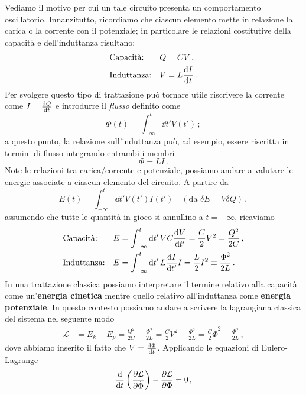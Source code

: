 \noindent Vediamo il motivo per cui un tale circuito presenta un comportamento oscillatorio. Innanzitutto, ricordiamo che ciascun elemento mette in relazione la carica o la corrente con il potenziale; in particolare le relazioni costitutive della capacità e dell'induttanza risultano:
\begin{align*}
    &\text{Capacità:} &Q & =CV\, , \\
    &\text{Induttanza:} &V &= L\dv{I}{t}\, .
\end{align*}
Per svolgere questo tipo di trattazione può tornare utile riscrivere la corrente come $I=\dv{Q}{t}$ e introdurre il \textit{flusso} definito come
\begin{equation*}
    \Phi(t)=\int_{-\infty}^{t} \dd{t'} V(t') \, ;
\end{equation*}
a questo punto, la relazione sull'induttanza può, ad esempio, essere riscritta in termini di flusso integrando entrambi i membri 
\begin{equation*}
    \Phi = LI \, .
\end{equation*}
Note le relazioni tra carica/corrente e potenziale, possiamo andare a valutare le energie associate a ciascun elemento del circuito. A partire da
\begin{equation}\label{eq:general-energy}
    E(t)=\int_{-\infty}^{t} \dd{t'} V(t')I(t') \quad (\text{da } \delta E = V \delta Q) \, ,
\end{equation}
assumendo che tutte le quantità in gioco si annullino a $t=-\infty$, ricaviamo
\begin{align*}
    &\text{Capacità:} &E&=\int_{-\infty}^{t} \dd{t'} VC\derivative{V}{t'}=\frac C 2 V^2 = \frac{Q^2}{2C} \, , \\
    &\text{Induttanza:} &E&=\int_{-\infty}^{t} \dd{t'} L\derivative{I}{t'}I=\frac L 2 I^2 \equiv \frac{\Phi^2}{2L}\, .
\end{align*}
In una trattazione classica possiamo interpretare il termine relativo alla capacità come un'\textbf{energia cinetica} mentre quello relativo all'induttanza come \textbf{energia potenziale}. In questo contesto possiamo andare a scrivere la lagrangiana classica del sistema nel seguente modo
\begin{align*}
    \mathcal{L}&= E_k - E_p = \frac{Q^2}{2C}-\frac{\Phi^2}{2L} = \frac{C}{2}V^2-\frac{\Phi^2}{2L} = \frac{C}{2}\dot{\Phi}^2-\frac{\Phi^2}{2L} \, ,
\end{align*}
dove abbiamo inserito il fatto che $V = \dv{\Phi}{t}$. Applicando le equazioni di Eulero-Lagrange
\begin{equation*}
    \dv{t} \left(\pdv{\mathcal{L}}{\dot{\Phi}}\right)-\pdv{\mathcal{L}}{\Phi}=0 \, ,
\end{equation*}
